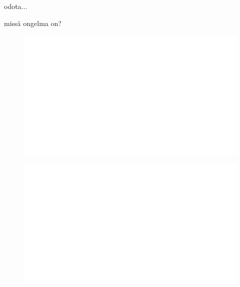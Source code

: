 \noindent
odota...

missä ongelma on?


\begin{centering}
    \begin{figure}[h]
        \centering
        \includegraphics[width=\textwidth]{whyareyoucheckingthenameofthisfile.png}
    \end{figure}
\end{centering}

\begin{centering}
    \begin{figure}[h!]
        \centering
        \includegraphics[width=\textwidth]{whyareyoucheckingthenameofthisfile.png}
    \end{figure}
\end{centering}

